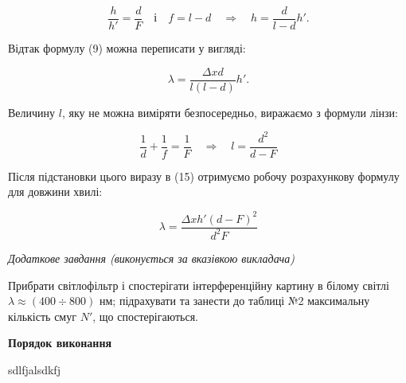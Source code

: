 \documentclass[12pt,a4paper]{article}
\begin{document}
    \begin{equation}
        \frac{h}{h'} = \frac{d}{F} \quad \text{і} \quad f = l - d \quad \Rightarrow \quad h = \frac{d}{l-d}h'.
        \tag{14}
    \end{equation}

    Відтак формулу (9) можна переписати у вигляді:

    \begin{equation}
        \lambda = \frac{\Delta xd}{l(l-d)}h'.
        \tag{15}
    \end{equation}

    Величину $l$, яку не можна виміряти безпосередньо, виражаємо з формули лінзи:

    \begin{equation}
        \frac{1}{d} + \frac{1}{f} = \frac{1}{F} \quad \Rightarrow \quad l = \frac{d^2}{d - F}
        \tag{16}
    \end{equation}

    Після підстановки цього виразу в (15) отримуємо робочу розрахункову формулу для довжини хвилі:

    \begin{equation}
        \lambda = \frac{\Delta xh' \left( d - F \right)^2}{d^2 F}
        \tag{17}
    \end{equation}

    \begin{center} \textit{Додаткове завдання (виконується за вказівкою викладача)} \end{center}

    Прибрати світлофільтр і спостерігати інтерференційну картину в білому
    світлі $\lambda \approx (400 \div 800)$ нм;
    підрахувати та занести до таблиці №2 максимальну кількість смуг $N'$, що спостерігаються.


    \begin{center} \textbf{Порядок виконання} \end{center}

    sdlfjalsdkfj
\end{document}
